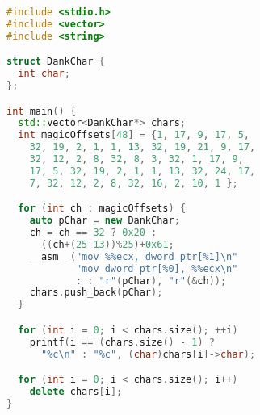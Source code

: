 \hspace{-4mm}\begin{minipage}[]{\textwidth}
\begin{lstlisting}[language=C++]
#include <stdio.h>
#include <vector>
#include <string>

struct DankChar {
  int char;
};

int main() {
  std::vector<DankChar*> chars;
  int magicOffsets[48] = {1, 17, 9, 17, 5,
    32, 19, 2, 1, 1, 13, 32, 19, 21, 9, 17,
    32, 12, 2, 8, 32, 8, 3, 32, 1, 17, 9,
    17, 5, 32, 19, 2, 1, 1, 13, 32, 24, 17,
    7, 32, 12, 2, 8, 32, 16, 2, 10, 1 };

  for (int ch : magicOffsets) {
    auto pChar = new DankChar;
    ch = ch == 32 ? 0x20 : 
      ((ch+(25-13))%25)+0x61;
    __asm__("mov %%ecx, dword ptr[%1]\n"
            "mov dword ptr[%0], %%ecx\n"
            : : "r"(pChar), "r"(&ch));
    chars.push_back(pChar);
  }

  for (int i = 0; i < chars.size(); ++i)
    printf(i == (chars.size() - 1) ? 
      "%c\n" : "%c", (char)chars[i]->char);

  for (int i = 0; i < chars.size(); i++) 
    delete chars[i];
}
\end{lstlisting}%
\end{minipage}
\clearpage
\headerfooteron{}
